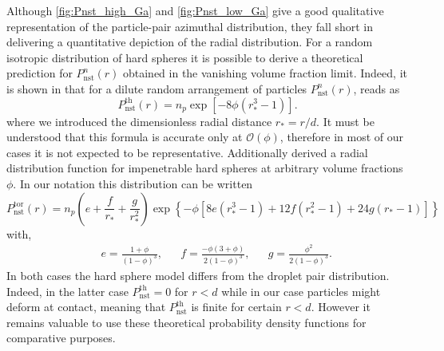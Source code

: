 Although \ref{fig:Pnst_high_Ga} and \ref{fig:Pnst_low_Ga} give a good qualitative representation of the particle-pair azimuthal distribution, they fall short in delivering a quantitative depiction of the radial distribution.
For a random isotropic distribution of hard spheres it is possible to derive a theoretical prediction for $P_\text{nst}^n(r)$ obtained in the vanishing volume fraction limit. 
Indeed, it is shown in \citet{zhang2021ensemble} that for a dilute random arrangement of particles $P_\text{nst}^n(r)$, reads as
\begin{equation}
    P_\text{nst}^\text{th}(r) = n_p\exp\left[- 8\phi\left(r_*^3-1\right)\right].
    \label{eq:Pnst_dilute}
\end{equation}
where we introduced the dimensionless radial distance $r_* = r/d$. 
It must be understood that this formula is accurate only at $\mathcal{O}(\phi)$, therefore in most of our cases it is not expected to be representative.
Additionally \citet{torquato1990nearest} derived a radial distribution function for impenetrable hard spheres at arbitrary volume fractions $\phi$. 
In our notation this distribution can be written
\begin{equation}
    P_\text{nst}^\text{tor}(r) = 
        n_p\left(e+\frac{f}{r_*} +\frac{g}{r_*^2}\right)
    \exp\left\{-\phi\left[8e\left(r_*^3-1\right)+12 f\left(r_*^2-1\right)+24g\left(r_*-1\right)\right]\right\}
    \label{eq:torquato}
\end{equation}
with, 
\begin{align*}
    && e= \frac{1+\phi}{(1-\phi)^3},
    && f= \frac{-\phi (3+\phi)}{2(1-\phi)^3},
    && g= \frac{\phi^2}{2(1-\phi)^3}.
\end{align*}
In both cases the hard sphere model differs from the droplet pair distribution.
Indeed, in the latter case $P_\text{nst}^\text{th} = 0$ for $r<d$ while in our case particles might deform at contact, meaning that $P_\text{nst}^\text{th}$ is finite for certain $r<d$. 
However it remains valuable to use these theoretical probability density functions for comparative purposes. 


